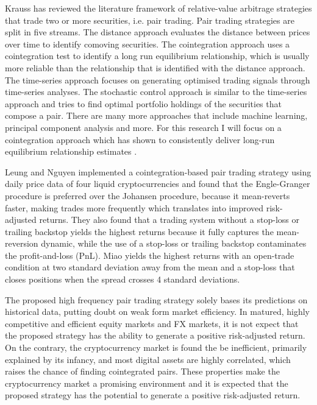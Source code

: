 \documentclass[12pt,english,authoryear]{article}
\begin{document}
Krauss \citeyear{Krauss_2017} has reviewed the literature framework of relative-value arbitrage strategies that trade two or more securities, i.e. pair trading. Pair trading strategies are split in five streams. The distance approach evaluates the distance between prices over time to identify comoving securities. The cointegration approach uses a cointegration test to identify a long run equilibrium relationship, which is usually more reliable than the relationship that is identified with the distance approach. The time-series approach focuses on generating optimised trading signals through time-series analyses. The stochastic control approach is similar to the time-series approach and tries to find optimal portfolio holdings of the securities that compose a pair. There are many more approaches that include machine learning, principal component analysis and more. For this research I will focus on a cointegration approach which has shown to consistently deliver long-run equilibrium relationship estimates \cite{Inder_1993}.

Leung and Nguyen \citeyear{Leung_2018} implemented a cointegration-based pair trading strategy using daily price data of four liquid cryptocurrencies and found that the Engle-Granger procedure is preferred over the Johansen procedure, because it mean-reverts faster, making trades more frequently which translates into improved risk-adjusted returns. They also found that a trading system without a stop-loss or trailing backstop yields the highest returns because it fully captures the mean-reversion dynamic, while the use of a stop-loss or trailing backstop contaminates the profit-and-loss (PnL). Miao \citeyear{Miao_2014} yields the highest returns with an open-trade condition at two standard deviation away from the mean and a stop-loss that closes positions when the spread crosses 4 standard deviations.

The proposed high frequency pair trading strategy solely bases its predictions on historical data, putting doubt on weak form market efficiency. In matured, highly competitive and efficient equity markets and FX markets, it is not expect that the proposed strategy has the ability to generate a positive risk-adjusted return. On the contrary, the cryptocurrency market is found the be inefficient, primarily explained by its infancy, and most digital assets are highly correlated, which raises the chance of finding cointegrated pairs. These properties make the cryptocurrency market a promising environment and it is expected that the proposed strategy has the potential to generate a positive risk-adjusted return. 
\end{document}
